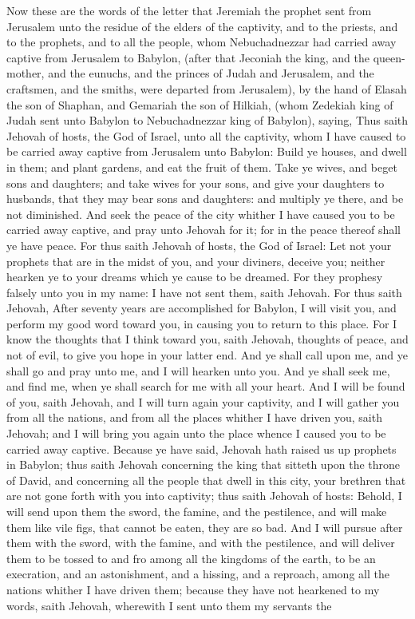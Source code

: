 Now these are the words of the letter that Jeremiah the prophet sent from Jerusalem unto the residue of the elders of the captivity, and to the priests, and to the prophets, and to all the people, whom Nebuchadnezzar had carried away captive from Jerusalem to Babylon, (after that Jeconiah the king, and the queen-mother, and the eunuchs, and the princes of Judah and Jerusalem, and the craftsmen, and the smiths, were departed from Jerusalem), by the hand of Elasah the son of Shaphan, and Gemariah the son of Hilkiah, (whom Zedekiah king of Judah sent unto Babylon to Nebuchadnezzar king of Babylon), saying, Thus saith Jehovah of hosts, the God of Israel, unto all the captivity, whom I have caused to be carried away captive from Jerusalem unto Babylon: Build ye houses, and dwell in them; and plant gardens, and eat the fruit of them. Take ye wives, and beget sons and daughters; and take wives for your sons, and give your daughters to husbands, that they may bear sons and daughters: and multiply ye there, and be not diminished. And seek the peace of the city whither I have caused you to be carried away captive, and pray unto Jehovah for it; for in the peace thereof shall ye have peace. For thus saith Jehovah of hosts, the God of Israel: Let not your prophets that are in the midst of you, and your diviners, deceive you; neither hearken ye to your dreams which ye cause to be dreamed. For they prophesy falsely unto you in my name: I have not sent them, saith Jehovah. For thus saith Jehovah, After seventy years are accomplished for Babylon, I will visit you, and perform my good word toward you, in causing you to return to this place. For I know the thoughts that I think toward you, saith Jehovah, thoughts of peace, and not of evil, to give you hope in your latter end. And ye shall call upon me, and ye shall go and pray unto me, and I will hearken unto you. And ye shall seek me, and find me, when ye shall search for me with all your heart. And I will be found of you, saith Jehovah, and I will turn again your captivity, and I will gather you from all the nations, and from all the places whither I have driven you, saith Jehovah; and I will bring you again unto the place whence I caused you to be carried away captive.  Because ye have said, Jehovah hath raised us up prophets in Babylon; thus saith Jehovah concerning the king that sitteth upon the throne of David, and concerning all the people that dwell in this city, your brethren that are not gone forth with you into captivity; thus saith Jehovah of hosts: Behold, I will send upon them the sword, the famine, and the pestilence, and will make them like vile figs, that cannot be eaten, they are so bad. And I will pursue after them with the sword, with the famine, and with the pestilence, and will deliver them to be tossed to and fro among all the kingdoms of the earth, to be an execration, and an astonishment, and a hissing, and a reproach, among all the nations whither I have driven them; because they have not hearkened to my words, saith Jehovah, wherewith I sent unto them my servants the 